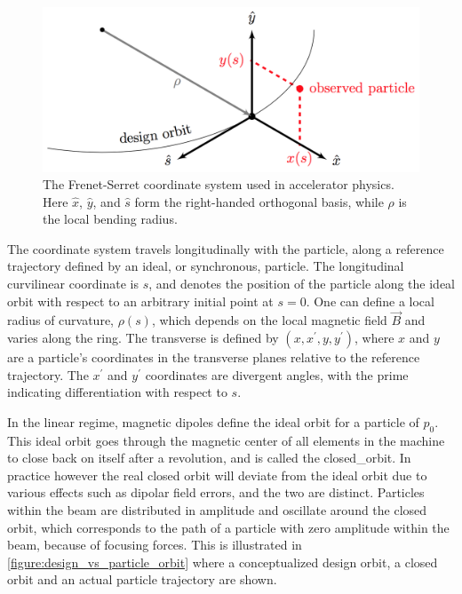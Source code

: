 \begin{figure}[!htb]
    \centering
    \includegraphics[width=0.9\linewidth]{Figures/Beam_Dynamics_Theory/Frenet_Serret_Coordinate_System.png}
    \caption{The Frenet-Serret coordinate system used in accelerator physics. Here \(\hat{x}\), \(\hat{y}\), and \(\hat{s}\) form the right-handed orthogonal basis, while \(\rho\) is the local bending radius.}
    \label{figure:frenet_serret_system}
\end{figure}

The coordinate system travels longitudinally with the particle, along a reference trajectory defined by an ideal, or \gls{synchronous}, particle.
The longitudinal curvilinear coordinate is \(s\), and denotes the position of the particle along the ideal orbit with respect to an arbitrary initial point at \(s = 0\).
One can define a local radius of curvature, \(\rho(s)\), which depends on the local magnetic field \(\vec{B}\) and varies along the ring.
The transverse  is defined by \((x, x^{\prime}, y, y^{\prime})\), where \(x\) and \(y\) are a particle's coordinates in the transverse planes relative to the reference trajectory.
The \(x^{\prime}\) and \(y^{\prime}\) coordinates are divergent angles, with the prime indicating differentiation with respect to \(s\).

In the linear regime, magnetic dipoles define the ideal orbit for a particle of  \(p_0\).
This ideal orbit goes through the magnetic center of all elements in the machine to close back on itself after a revolution, and is called the \gls{closed_orbit}.
In practice however the real closed orbit will deviate from the ideal orbit due to various effects such as dipolar field errors, and the two are distinct.
Particles within the beam are distributed in amplitude and oscillate around the closed orbit, which corresponds to the path of a particle with zero amplitude within the beam, because of focusing forces. 
This is illustrated in \cref{figure:design_vs_particle_orbit} where a conceptualized design orbit, a closed orbit and an actual particle trajectory are shown.

